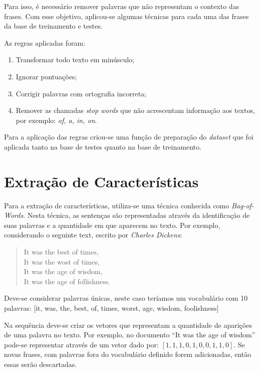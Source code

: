 \documentclass[conference]{IEEEtran}
\begin{document}
Para isso, é necessário remover palavras que não representam o contexto das frases. Com esse objetivo, aplicou-se algumas técnicas para cada uma das frases da base de treinamento e testes.

As regras aplicadas foram:

\begin{enumerate}
    \item Transformar todo texto em minúsculo;
    \item Ignorar pontuações;
    \item Corrigir palavras com ortografia incorreta;
    \item Remover as chamadas \textit{stop words} que não acrescentam informação aos textos, por exemplo: \textit{of, a, in, on}.
\end{enumerate}

Para a aplicação das regras criou-se uma função de preparação do \textit{dataset} que foi aplicada tanto na base de testes quanto na base de treinamento.

\section{Extração de Características}

Para a extração de características, utiliza-se uma técnica conhecida como \textit{Bag-of-Words}. Nesta técnica, as sentenças são representadas através da identificação de suas palavras e a quantidade em que aparecem no texto. Por exemplo, considerando o seguinte text, escrito por \textit{Charles Dickens}:

\begin{quote}
    It was the best of times,\\
    It was the wost of times,\\
    It was the age of wisdom,\\
    It was the age of follishness.
\end{quote}

Deve-se considerar palavras únicas, neste caso teríamos um vocabulário com 10 palavras: [it, was,
the, best, of, times, worst, age, wisdom, foolishness]

Na sequência deve-se criar os vetores que representam a quantidade de aparições de uma palavra no texto. Por exemplo, no documento ``It was the age of wisdom'' pode-se representar através de um vetor dado por: $[1, 1, 1, 0, 1, 0, 0, 1, 1, 0]$. Se novas frases, com palavras fora do vocabulário definido forem adicionadas, então essas serão descartadas.
\end{document}

